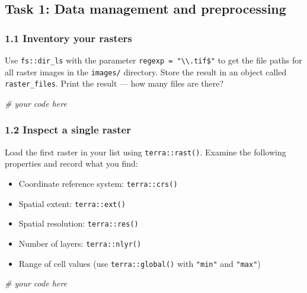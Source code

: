 \documentclass[
]{article}
\newenvironment{Shaded}{\begin{snugshade}}{\end{snugshade}}
\newcommand{\CommentTok}[1]{\textcolor[rgb]{0.56,0.35,0.01}{\textit{#1}}}
\providecommand{\tightlist}{%
  \setlength{\itemsep}{0pt}\setlength{\parskip}{0pt}}
\begin{document}
\subsection{Task 1: Data management and
preprocessing}\label{task-1-data-management-and-preprocessing}

\subsubsection{1.1 Inventory your rasters}\label{inventory-your-rasters}

Use \texttt{fs::dir\_ls} with the parameter
\texttt{regexp\ =\ "\textbackslash{}\textbackslash{}.tif\$"} to get the
file paths for all raster images in the \texttt{images/} directory.
Store the result in an object called \texttt{raster\_files}. Print the
result --- how many files are there?

\begin{Shaded}
\begin{Highlighting}[]
\CommentTok{\# your code here}
\end{Highlighting}
\end{Shaded}

\subsubsection{1.2 Inspect a single
raster}\label{inspect-a-single-raster}

Load the first raster in your list using \texttt{terra::rast()}. Examine
the following properties and record what you find:

\begin{itemize}
\tightlist
\item
  Coordinate reference system: \texttt{terra::crs()}
\item
  Spatial extent: \texttt{terra::ext()}
\item
  Spatial resolution: \texttt{terra::res()}
\item
  Number of layers: \texttt{terra::nlyr()}
\item
  Range of cell values (use \texttt{terra::global()} with \texttt{"min"}
  and \texttt{"max"})
\end{itemize}

\begin{Shaded}
\begin{Highlighting}[]
\CommentTok{\# your code here}
\end{Highlighting}
\end{Shaded}
\end{document}
